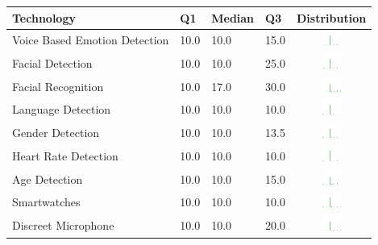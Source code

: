 \begin{table}[t]
\begin{center}
\small
\begin{tabular}{| p{2cm} | p{1cm} | p{1cm} | p{1cm} | c |}
\hline
Technology & Q1 &  Median & Q3 & Distribution  \\ 
\hline
Voice Based Emotion Detection  & 10.0 & 10.0 & 15.0 & \includegraphics[width = 2cm, height = 0.5cm]{../voicebasedemotiondetectionrisk} \\ 
Facial Detection  & 10.0 & 10.0 & 25.0 & \includegraphics[width = 2cm, height = 0.5cm]{../facialdetectionrisk} \\ 
Facial Recognition  & 10.0 & 17.0 & 30.0 & \includegraphics[width = 2cm, height = 0.5cm]{../facialrecognitionrisk} \\ 
Language Detection  & 10.0 & 10.0 & 10.0 & \includegraphics[width = 2cm, height = 0.5cm]{../languagedetectionrisk} \\ 
Gender Detection  & 10.0 & 10.0 & 13.5 & \includegraphics[width = 2cm, height = 0.5cm]{../genderdetectionrisk} \\ 
Heart Rate Detection  & 10.0 & 10.0 & 10.0 & \includegraphics[width = 2cm, height = 0.5cm]{../heartratedetectionrisk} \\ 
Age Detection  & 10.0 & 10.0 & 15.0 & \includegraphics[width = 2cm, height = 0.5cm]{../agedetectionrisk} \\ 
Smartwatches  & 10.0 & 10.0 & 10.0 & \includegraphics[width = 2cm, height = 0.5cm]{../smartwatchesrisk} \\ 
Discreet Microphone  & 10.0 & 10.0 & 20.0 & \includegraphics[width = 2cm, height = 0.5cm]{../discreetmicrophonerisk} \\ 

\end{tabular}
\end{center}
\end{table}
